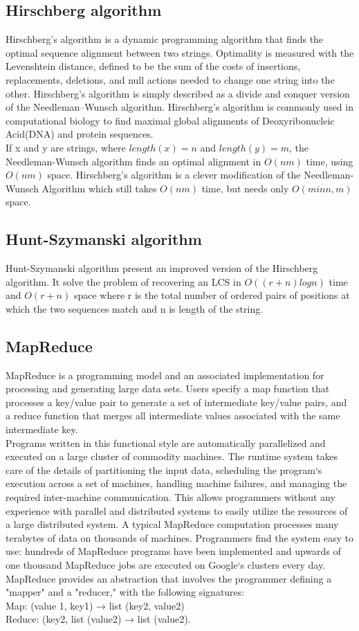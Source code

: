 \documentclass[journal,twoside]{IEEEtran}
\begin{document}
\subsection{Hirschberg algorithm}
Hirschberg's algorithm \cite{hirschberg} is a dynamic programming algorithm that finds the optimal sequence alignment between two strings. Optimality is measured with the Levenshtein distance, defined to be the sum of the costs of insertions, replacements, deletions, and null actions needed to change one string into the other. Hirschberg's algorithm is simply described as a divide and conquer version of the Needleman–Wunsch algorithm. Hirschberg's algorithm is commonly used in computational biology to find maximal global alignments of Deoxyribonucleic Acid(DNA) and protein sequences. \\
If x and y are strings, where $length(x) = n$ and $length(y) = m$, the Needleman-Wunsch algorithm finds an optimal alignment in $O(nm)$ time, using $O(nm)$ space. Hirschberg's algorithm is a clever modification of the Needleman-Wunsch Algorithm which still takes $O(nm)$ time, but needs only $O(min{n,m})$ space.

\subsection{Hunt-Szymanski algorithm}
Hunt-Szymanski algorithm \cite{hunt} present an improved version  of the Hirschberg algorithm. It solve the problem of recovering an LCS in $O((r+n)logn)$ time and $O(r+n)$ space where r is the total number of ordered pairs of positions at which the two sequences match and n is length of the string.

\subsection{MapReduce}
MapReduce is a programming model and an associated implementation for processing and generating large data sets. Users specify a map function that processes  a key/value pair to generate a set of intermediate key/value pairs, and a reduce  function that merges all intermediate values associated with the same intermediate key.
\\
Programs written in this functional style are automatically parallelized and executed on a large cluster of commodity machines. The runtime system takes care of the details of partitioning the input data, scheduling the program‘s execution across a set of machines, handling machine failures, and managing the required inter-machine communication. This allows programmers without any experience with parallel and distributed systems to easily utilize the resources of a large distributed system. A typical MapReduce computation processes many terabytes of data on thousands of machines. Programmers find the system easy to use: hundreds of MapReduce programs have been implemented and upwards of one thousand MapReduce jobs are executed on Google‘s clusters every day. MapReduce provides an abstraction that involves the programmer defining a "mapper" and a "reducer," with the following signatures:
\\ Map: (value 1, key1) → list (key2, value2) 
\\ Reduce: (key2, list (value2) → list (value2).
\end{document}
